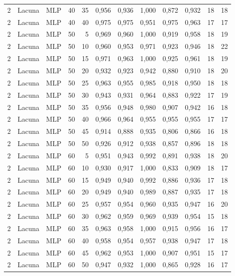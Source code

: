 \begin{longtable}{@{}rllrrrrrrrrr@{}}
2 & Lacuna & MLP & 40 & 35 & 0,956 & 0,936 & 1,000 & 0,872 & 0,932 & 18 & 18 \\
2 & Lacuna & MLP & 40 & 40 & 0,975 & 0,975 & 0,951 & 0,975 & 0,963 & 17 & 17 \\
2 & Lacuna & MLP & 50 & 5 & 0,969 & 0,960 & 1,000 & 0,919 & 0,958 & 18 & 19 \\
2 & Lacuna & MLP & 50 & 10 & 0,960 & 0,953 & 0,971 & 0,923 & 0,946 & 18 & 22 \\
2 & Lacuna & MLP & 50 & 15 & 0,971 & 0,963 & 1,000 & 0,925 & 0,961 & 18 & 19 \\
2 & Lacuna & MLP & 50 & 20 & 0,932 & 0,923 & 0,942 & 0,880 & 0,910 & 18 & 20 \\
2 & Lacuna & MLP & 50 & 25 & 0,963 & 0,955 & 0,985 & 0,918 & 0,950 & 18 & 18 \\
2 & Lacuna & MLP & 50 & 30 & 0,943 & 0,931 & 0,964 & 0,883 & 0,922 & 17 & 19 \\
2 & Lacuna & MLP & 50 & 35 & 0,956 & 0,948 & 0,980 & 0,907 & 0,942 & 16 & 18 \\
2 & Lacuna & MLP & 50 & 40 & 0,966 & 0,964 & 0,955 & 0,955 & 0,955 & 17 & 17 \\
2 & Lacuna & MLP & 50 & 45 & 0,914 & 0,888 & 0,935 & 0,806 & 0,866 & 16 & 18 \\
2 & Lacuna & MLP & 50 & 50 & 0,926 & 0,912 & 0,938 & 0,857 & 0,896 & 18 & 18 \\
2 & Lacuna & MLP & 60 & 5 & 0,951 & 0,943 & 0,992 & 0,891 & 0,938 & 18 & 20 \\
2 & Lacuna & MLP & 60 & 10 & 0,930 & 0,917 & 1,000 & 0,833 & 0,909 & 18 & 17 \\
2 & Lacuna & MLP & 60 & 15 & 0,949 & 0,940 & 0,992 & 0,886 & 0,936 & 17 & 18 \\
2 & Lacuna & MLP & 60 & 20 & 0,949 & 0,940 & 0,989 & 0,887 & 0,935 & 17 & 18 \\
2 & Lacuna & MLP & 60 & 25 & 0,957 & 0,954 & 0,960 & 0,935 & 0,947 & 16 & 20 \\
2 & Lacuna & MLP & 60 & 30 & 0,962 & 0,959 & 0,969 & 0,939 & 0,954 & 15 & 18 \\
2 & Lacuna & MLP & 60 & 35 & 0,963 & 0,958 & 1,000 & 0,915 & 0,956 & 16 & 17 \\
2 & Lacuna & MLP & 60 & 40 & 0,958 & 0,954 & 0,957 & 0,938 & 0,947 & 17 & 18 \\
2 & Lacuna & MLP & 60 & 45 & 0,962 & 0,953 & 1,000 & 0,907 & 0,951 & 15 & 17 \\
2 & Lacuna & MLP & 60 & 50 & 0,947 & 0,932 & 1,000 & 0,865 & 0,928 & 16 & 17 \\

\end{longtable}
